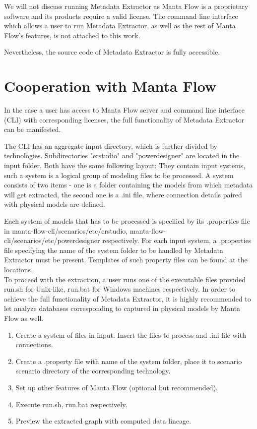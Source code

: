 \documentclass[12pt,a4paper]{report}
\begin{document}
We will not discuss running Metadata Extractor as Manta Flow is a proprietary software and its products require a valid license. 
The command line interface which allows a user to run Metadata Extractor, as well as the rest of Manta Flow's features, is not attached to this work.

Nevertheless, the source code of Metadata Extractor is fully accessible.

\section{Cooperation with Manta Flow}

In the case a user has access to Manta Flow server and command line interface (CLI) with corresponding licenses, the full functionality of Metadata Extractor can be manifested.

The CLI has an aggregate input directory, which is further divided by technologies.
Subdirectories "erstudio" and "powerdesigner" are located in the input folder.  
Both have the same following layout: 
They contain input systems, such a system is a logical group of modeling files to be processed.
A system consists of two items - one is a folder containing the models from which metadata will get extracted, the second one is a .ini file, where connection details paired with physical models are defined.

Each system of models that has to be processed is specified by its .properties file in manta-flow-cli/scenarios/etc/erstudio, manta-flow-cli/scenarios/etc/powerdesigner respectively. 
For each input system, a .properties file specifying the name of the system folder to be handled by Metadata Extractor must be present. Templates of such property files can be found at the locations. \\ 

To proceed with the extraction, a user runs one of the executable files provided \textunderscore run.sh for Unix-like, \textunderscore run.bat for Windows machines respectively. In order to achieve the full functionality of Metadata Extractor, it is highly recommended to let analyze databases corresponding to captured in physical models by Manta Flow as well.

\begin{enumerate}
	\item Create a system of files in input. Insert the files to process and .ini file with connections.
	\item Create a .property file with name of the system folder, place it to scenario scenario directory of the corresponding technology.
	\item Set up other features of Manta Flow (optional but recommended).
	\item Execute \textunderscore run.sh, \textunderscore run.bat respectively.
	\item Preview the extracted graph with computed data lineage.
\end{enumerate}
\end{document}
